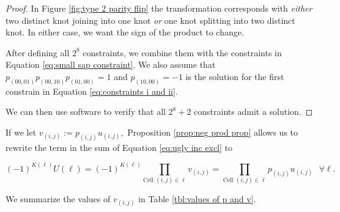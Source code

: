 \documentclass[12pt]{article}
\theoremstyle{plain}
\theoremstyle{definition}
\theoremstyle{remark}
\theoremstyle{definition}
\begin{document}
\begin{proof}
In Figure \ref{fig:type 2 parity flip} the transformation corresponds with \textit{either} two distinct knot joining into one knot \textit{or} one knot splitting into two distinct knot. In either case, we want the sign of the product to change. 

After defining all $2^8$ constraints, we combine them with the constraints in Equation \ref{eq:small sap constraint}. We also assume that $p_{(00,01)} p_{(00,10)} p_{(01,00)} = 1$ and $p_{(10,00)} = -1$ is the solution for the first constrain in Equation \ref{eq:constraints i and ii}. 

We can then use software to verify that all $2^8 +2$ constraints admit a solution.



\end{proof}

If we let $v_{(i,j)} := p_{(i,j)}u_{(i,j)},$ Proposition \ref{prop:neg prod prop} allows us to rewrite the term in the sum of Equation \ref{eq:ugly inc excl} to

\begin{equation}
    (-1)^{K(\ell)}U(\ell) = (-1)^{K(\ell)} \prod_{\text{Cell }(i,j) \in \ell} v_{(i,j)} = \prod_{\text{Cell }(i,j) \in \ell} p_{(i,j)}u_{(i,j)} \text{ $\forall \ell$}.
    \label{eq:term fix}
\end{equation}

We summarize the values of $v_{(i,j)}$ in Table \ref{tbl:values of p and v}.
\end{document}
